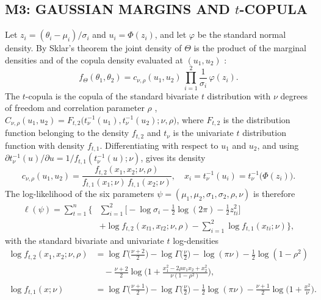\subsection{M3: GAUSSIAN MARGINS AND $t$-COPULA}
Let $z_i=(\theta_i-\mu_i)/\sigma_i$ and $u_i=\Phi(z_i)$, and let $\varphi$ be the standard normal density. By Sklar's theorem the joint density of $\Theta$ is the product of the marginal densities and of the copula density evaluated at $(u_1,u_2)$ \citep[Sect.~5.1]{McNeil05}:
\begin{equation}
\label{eq:m3dens}
f_\Theta(\theta_1,\theta_2)=c_{\nu,\rho}(u_1,u_2)\,\prod_{i=1}^2\frac{1}{\sigma_i}\,\varphi(z_i).
\end{equation}
The $t$-copula is the copula of the standard bivariate $t$ distribution with $\nu$ degrees of freedom and correlation parameter $\rho$ \citep[Ch.~5]{McNeil05}, $C_{\nu,\rho}(u_1,u_2)=F_{t,2}\big(t_\nu^{-1}(u_1),t_\nu^{-1}(u_2);\nu,\rho\big)$, where $F_{t,2}$ is the distribution function belonging to the density $f_{t,2}$ and $t_\nu$ is the univariate $t$ distribution function with density $f_{t,1}$. Differentiating with respect to $u_1$ and $u_2$, and using $\partial t_\nu^{-1}(u)/\partial u=1/f_{t,1}(t_\nu^{-1}(u);\nu)$, gives its density
\begin{equation}
\label{eq:tcopdens}
c_{\nu,\rho}(u_1,u_2)=\frac{f_{t,2}(x_1,x_2;\nu,\rho)}{f_{t,1}(x_1;\nu)\,f_{t,1}(x_2;\nu)},\quad x_i=t_\nu^{-1}(u_i)=t_\nu^{-1}\big(\Phi(z_i)\big).
\end{equation}
The log-likelihood of the six parameters $\psi=(\mu_1,\mu_2,\sigma_1,\sigma_2,\rho,\nu)$ is therefore
\begin{equation}
\label{eq:m3lik}
\begin{split}
\ell(\psi)=\sum_{t=1}^n\Big\{&\sum_{i=1}^2\Big[-\log\sigma_i-\tfrac12\log(2\pi)-\tfrac12z_{ti}^2\Big]\\
&+\log f_{t,2}(x_{t1},x_{t2};\nu,\rho)-\sum_{i=1}^2\log f_{t,1}(x_{ti};\nu)\Big\},
\end{split}
\end{equation}
with the standard bivariate and univariate $t$ log-densities
\begin{align*}
\log f_{t,2}(x_1,x_2;\nu,\rho)&=\log\Gamma\big(\tfrac{\nu+2}2\big)-\log\Gamma\big(\tfrac\nu2\big)-\log(\pi\nu)-\tfrac12\log(1-\rho^2)\\
&\quad-\tfrac{\nu+2}{2}\log\Big(1+\frac{x_1^2-2\rho x_1x_2+x_2^2}{\nu(1-\rho^2)}\Big),\\
\log f_{t,1}(x;\nu)&=\log\Gamma\big(\tfrac{\nu+1}2\big)-\log\Gamma\big(\tfrac\nu2\big)-\tfrac12\log(\pi\nu)-\tfrac{\nu+1}2\log\Big(1+\frac{x^2}\nu\Big).
\end{align*}
